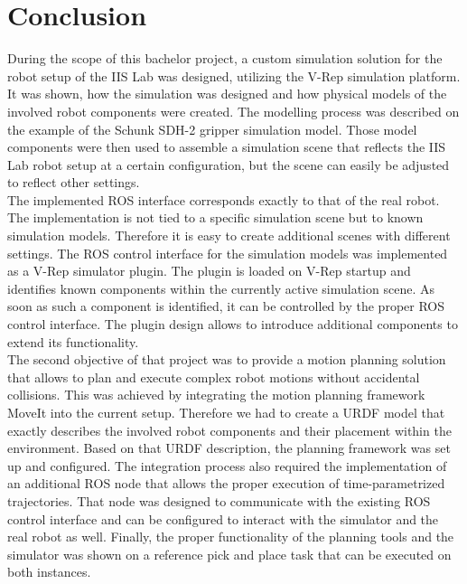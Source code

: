 
\chapter{Conclusion}

During the scope of this bachelor project, a custom simulation solution for the robot setup of the IIS Lab was designed, utilizing the V-Rep simulation platform. It was shown, how the simulation was designed and how physical models of the involved robot components were created. The modelling process was described on the example of the Schunk SDH-2 gripper simulation model. Those model components were then used to assemble a simulation scene that reflects the IIS Lab robot setup at a certain configuration, but the scene can easily be adjusted to reflect other settings. \\

The implemented ROS interface corresponds exactly to that of the real robot. The implementation is not tied to a specific simulation scene but to known simulation models. Therefore it is easy to create additional scenes with different settings. The ROS control interface for the simulation models was implemented as a V-Rep simulator plugin. The plugin is loaded on V-Rep startup and identifies known components within the currently active simulation scene. As soon as such a component is identified, it can be controlled by the proper ROS control interface. The plugin design allows to introduce additional components to extend its functionality. \\

The second objective of that project was to provide a motion planning solution that allows to plan and execute complex robot motions without accidental collisions. This was achieved by integrating the motion planning framework MoveIt into the current setup. Therefore we had to create a URDF model that exactly describes the involved robot components and their placement within the environment. Based on that URDF description, the planning framework was set up and configured. The integration process also required the implementation of an additional ROS node that allows the proper execution of time-parametrized trajectories. That node was designed to communicate with the existing ROS control interface and can be configured to interact with the simulator and the real robot as well. Finally, the proper functionality of the planning tools and the simulator was shown on a reference pick and place task that can be executed on both instances.
